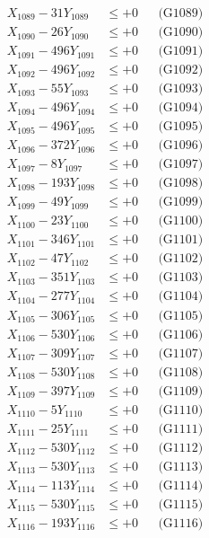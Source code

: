\documentclass[a4paper,10pt]{article}
\begin{document}
{\begin{align}
X_{1089} - 31Y_{1089} &\leq +0 && \text{(G1089)} \\
X_{1090} - 26Y_{1090} &\leq +0 && \text{(G1090)} \\
\allowbreak
X_{1091} - 496Y_{1091} &\leq +0 && \text{(G1091)} \\
X_{1092} - 496Y_{1092} &\leq +0 && \text{(G1092)} \\
X_{1093} - 55Y_{1093} &\leq +0 && \text{(G1093)} \\
X_{1094} - 496Y_{1094} &\leq +0 && \text{(G1094)} \\
X_{1095} - 496Y_{1095} &\leq +0 && \text{(G1095)} \\
X_{1096} - 372Y_{1096} &\leq +0 && \text{(G1096)} \\
X_{1097} - 8Y_{1097} &\leq +0 && \text{(G1097)} \\
X_{1098} - 193Y_{1098} &\leq +0 && \text{(G1098)} \\
X_{1099} - 49Y_{1099} &\leq +0 && \text{(G1099)} \\
X_{1100} - 23Y_{1100} &\leq +0 && \text{(G1100)} \\
\allowbreak
X_{1101} - 346Y_{1101} &\leq +0 && \text{(G1101)} \\
X_{1102} - 47Y_{1102} &\leq +0 && \text{(G1102)} \\
X_{1103} - 351Y_{1103} &\leq +0 && \text{(G1103)} \\
X_{1104} - 277Y_{1104} &\leq +0 && \text{(G1104)} \\
X_{1105} - 306Y_{1105} &\leq +0 && \text{(G1105)} \\
X_{1106} - 530Y_{1106} &\leq +0 && \text{(G1106)} \\
X_{1107} - 309Y_{1107} &\leq +0 && \text{(G1107)} \\
X_{1108} - 530Y_{1108} &\leq +0 && \text{(G1108)} \\
X_{1109} - 397Y_{1109} &\leq +0 && \text{(G1109)} \\
X_{1110} - 5Y_{1110} &\leq +0 && \text{(G1110)} \\
\allowbreak
X_{1111} - 25Y_{1111} &\leq +0 && \text{(G1111)} \\
X_{1112} - 530Y_{1112} &\leq +0 && \text{(G1112)} \\
X_{1113} - 530Y_{1113} &\leq +0 && \text{(G1113)} \\
X_{1114} - 113Y_{1114} &\leq +0 && \text{(G1114)} \\
X_{1115} - 530Y_{1115} &\leq +0 && \text{(G1115)} \\
X_{1116} - 193Y_{1116} &\leq +0 && \text{(G1116)} \\

\end{align}}
\end{document}
